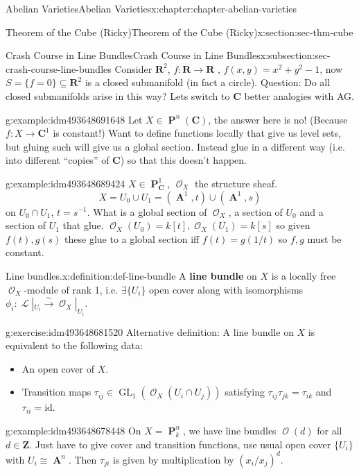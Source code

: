 \documentclass[oneside,10pt,]{book}
\newcommand{\terminology}[1]{\textbf{#1}}
\numberwithin{equation}{section}
\newcommand{\sheaf}[1]{\operatorname{\mathcal{#1}}}
\newcommand{\ZZ}{\mathbf{Z}}
\newcommand{\RR}{\mathbf{R}}
\newcommand{\CC}{\mathbf{C}}
\newcommand{\id}{\mathrm{id}}
\DeclareMathOperator{\aff}{\mathbf{A}}
\DeclareMathOperator{\PP}{\mathbf{P}}
\DeclareMathOperator{\GL}{GL}
\begin{document}
\begin{chapterptx}{Abelian Varieties}{}{Abelian Varieties}{}{}{x:chapter:chapter-abelian-varieties}
\begin{sectionptx}{Theorem of the Cube (Ricky)}{}{Theorem of the Cube (Ricky)}{}{}{x:section:sec-thm-cube}
\begin{subsectionptx}{Crash Course in Line Bundles}{}{Crash Course in Line Bundles}{}{}{x:subsection:sec-crash-course-line-bundles}
Consider \(\RR^2\), \(f\colon \RR \to \RR\) , \(f(x,y) = x^2 + y^2 -1\), now \(S = \{f=0\}\subseteq \RR^2\) is a closed submanifold (in fact a circle). Question: Do all closed submanifolds arise in this way? Lets switch to \(\CC\) better analogies with AG.%
\begin{example}{}{g:example:idm493648691648}%
Let \(X\in \PP^n(\CC)\), the answer here is no! (Because \(f\colon X \to \CC^1\) is constant!) Want to define functions locally that give us level sets, but gluing such will give us a global section. Instead glue in a different way (i.e. into different ``copies'' of \(\CC\)) so that this doesn't happen.%
\end{example}
\begin{example}{}{g:example:idm493648689424}%
\(X\in \PP_\CC^1\), \(\sheaf O_X\) the structure sheaf.%
\begin{equation*}
X = U_0 \cup U_1 = (\aff^1,t) \cup(\aff^1,s)
\end{equation*}
on \(U_0\cap U_1\), \(t = s^{-1}\). What is a global section of \(\sheaf O_X\), a section of \(U_0\) and a section of \(U_1\) that glue. \(\sheaf O_X(U_0) =  k[t], \sheaf O_X(U_1) =  k[s]\) so given \(f(t), g(s)\) these glue to a global section iff \(f(t) = g(1/t)\) so \(f,g\) must be constant.%
\end{example}
\begin{definition}{Line bundles.}{x:definition:def-line-bundle}%
A \terminology{line bundle} on \(X\) is a locally free \(\sheaf O_X\)-module of rank 1, i.e. \(\exists \{U_i\}\) open cover along with isomorphisms \(\phi_i\colon \sheaf L|_{U_i} \xrightarrow\sim \sheaf O_X |_{U_i}\).%
\end{definition}
\begin{inlineexercise}{}{g:exercise:idm493648681520}%
Alternative definition: A line bundle on \(X\) is equivalent to the following data:%
\begin{itemize}[label=\textbullet]
\item{}An open cover of \(X\).%
\item{}Transition maps \(\tau_{ij} \in \GL_1(\sheaf O_X(U_i\cap U_j))\) satisfying \(\tau_{ij}\tau_{jk} =\tau_{ik}\) and \(\tau_{ii} = \id\).%
\end{itemize}
%
\end{inlineexercise}
\begin{example}{}{g:example:idm493648678448}%
On \(X = \PP^n_k\), we have line bundles \(\sheaf O(d)\) for all \(d\in \ZZ\). Just have to give cover and transition functions, use usual open cover \(\{U_i\}\) with \(U_i\cong \aff^n\). Then \(\tau_{ji}\) is given by multiplication by \((x_i/x_j)^d\).%

\end{example}
\end{subsectionptx}
\end{sectionptx}
\end{chapterptx}
\end{document}
